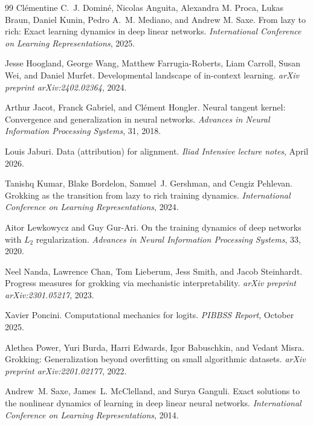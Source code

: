 \documentclass[11pt,a4paper]{article}
\begin{document}
\begin{thebibliography}{99}
Cl\'{e}mentine C.~J. Domin\'{e}, Nicolas Anguita, Alexandra M. Proca, Lukas Braun, Daniel Kunin, Pedro A.~M. Mediano, and Andrew M. Saxe.
\newblock From lazy to rich: Exact learning dynamics in deep linear networks.
\newblock \emph{International Conference on Learning Representations}, 2025.

Jesse Hoogland, George Wang, Matthew Farrugia-Roberts, Liam Carroll, Susan Wei, and Daniel Murfet.
\newblock Developmental landscape of in-context learning.
\newblock \emph{arXiv preprint arXiv:2402.02364}, 2024.

Arthur Jacot, Franck Gabriel, and Cl\'{e}ment Hongler.
\newblock Neural tangent kernel: Convergence and generalization in neural networks.
\newblock \emph{Advances in Neural Information Processing Systems}, 31, 2018.

Louis Jaburi.
\newblock Data (attribution) for alignment.
\newblock \emph{Iliad Intensive lecture notes}, April 2026.

Tanishq Kumar, Blake Bordelon, Samuel~J. Gershman, and Cengiz Pehlevan.
\newblock Grokking as the transition from lazy to rich training dynamics.
\newblock \emph{International Conference on Learning Representations}, 2024.

Aitor Lewkowycz and Guy Gur-Ari.
\newblock On the training dynamics of deep networks with $L_2$ regularization.
\newblock \emph{Advances in Neural Information Processing Systems}, 33, 2020.

Neel Nanda, Lawrence Chan, Tom Lieberum, Jess Smith, and Jacob Steinhardt.
\newblock Progress measures for grokking via mechanistic interpretability.
\newblock \emph{arXiv preprint arXiv:2301.05217}, 2023.

Xavier Poncini.
\newblock Computational mechanics for logits.
\newblock \emph{PIBBSS Report}, October 2025.

Alethea Power, Yuri Burda, Harri Edwards, Igor Babuschkin, and Vedant Misra.
\newblock Grokking: Generalization beyond overfitting on small algorithmic datasets.
\newblock \emph{arXiv preprint arXiv:2201.02177}, 2022.

Andrew~M. Saxe, James~L. McClelland, and Surya Ganguli.
\newblock Exact solutions to the nonlinear dynamics of learning in deep linear neural networks.
\newblock \emph{International Conference on Learning Representations}, 2014.


\end{thebibliography}
\end{document}
